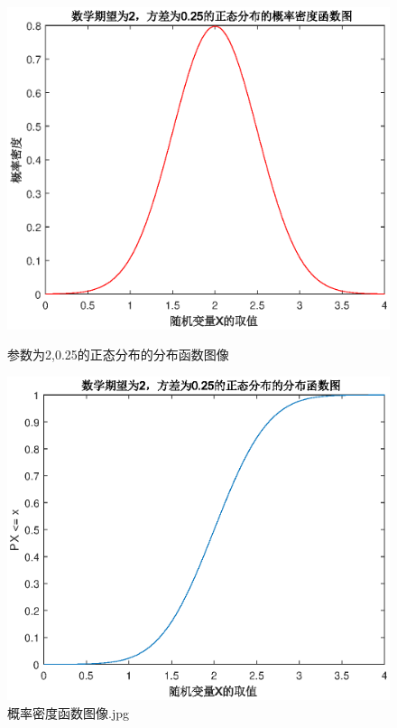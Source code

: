 \documentclass{article}
\begin{document}
\begin{figure}

\begin{minipage}[t]{0.5\textwidth}%
\centering  

\includegraphics[width=\textwidth]{2.eps}  

\caption{参数为2,0.25的正态分布的分布函数图像} \label{img:2} 
\end{minipage} 
\begin{minipage}[t]{0.5\textwidth}  
\centering  
\includegraphics[width=\textwidth]{3.eps}   
\caption{概率密度函数图像.jpg}   \label{img:3} 
\end{minipage}  

\end{figure}  
\end{document}
